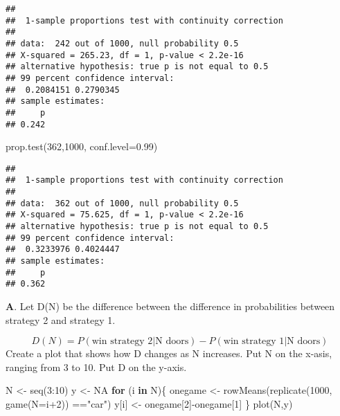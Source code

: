 \documentclass[
]{article}
\newenvironment{Shaded}{\begin{snugshade}}{\end{snugshade}}
\newcommand{\AttributeTok}[1]{\textcolor[rgb]{0.77,0.63,0.00}{#1}}
\newcommand{\ConstantTok}[1]{\textcolor[rgb]{0.00,0.00,0.00}{#1}}
\newcommand{\ControlFlowTok}[1]{\textcolor[rgb]{0.13,0.29,0.53}{\textbf{#1}}}
\newcommand{\DecValTok}[1]{\textcolor[rgb]{0.00,0.00,0.81}{#1}}
\newcommand{\FloatTok}[1]{\textcolor[rgb]{0.00,0.00,0.81}{#1}}
\newcommand{\FunctionTok}[1]{\textcolor[rgb]{0.00,0.00,0.00}{#1}}
\newcommand{\NormalTok}[1]{#1}
\newcommand{\OtherTok}[1]{\textcolor[rgb]{0.56,0.35,0.01}{#1}}
\newcommand{\SpecialCharTok}[1]{\textcolor[rgb]{0.00,0.00,0.00}{#1}}
\newcommand{\StringTok}[1]{\textcolor[rgb]{0.31,0.60,0.02}{#1}}
\begin{document}
\begin{verbatim}
## 
##  1-sample proportions test with continuity correction
## 
## data:  242 out of 1000, null probability 0.5
## X-squared = 265.23, df = 1, p-value < 2.2e-16
## alternative hypothesis: true p is not equal to 0.5
## 99 percent confidence interval:
##  0.2084151 0.2790345
## sample estimates:
##     p 
## 0.242
\end{verbatim}

\begin{Shaded}
\begin{Highlighting}[]
\FunctionTok{prop.test}\NormalTok{(}\DecValTok{362}\NormalTok{,}\DecValTok{1000}\NormalTok{, }\AttributeTok{conf.level=}\FloatTok{0.99}\NormalTok{)}
\end{Highlighting}
\end{Shaded}

\begin{verbatim}
## 
##  1-sample proportions test with continuity correction
## 
## data:  362 out of 1000, null probability 0.5
## X-squared = 75.625, df = 1, p-value < 2.2e-16
## alternative hypothesis: true p is not equal to 0.5
## 99 percent confidence interval:
##  0.3233976 0.4024447
## sample estimates:
##     p 
## 0.362
\end{verbatim}

\textbf{A}. Let D(N) be the difference between the difference in
probabilities between strategy 2 and strategy 1.

\[
D(N) = P(\text{win strategy 2}|\text{N doors}) - P(\text{win strategy 1}|\text{N doors})
\] Create a plot that shows how D changes as N increases. Put N on the
x-asis, ranging from 3 to 10. Put D on the y-axis.

\begin{Shaded}
\begin{Highlighting}[]
\NormalTok{N }\OtherTok{\textless{}{-}} \FunctionTok{seq}\NormalTok{(}\DecValTok{3}\SpecialCharTok{:}\DecValTok{10}\NormalTok{)}
\NormalTok{y }\OtherTok{\textless{}{-}} \ConstantTok{NA}
\ControlFlowTok{for}\NormalTok{ (i }\ControlFlowTok{in}\NormalTok{ N)\{}
\NormalTok{  onegame }\OtherTok{\textless{}{-}} \FunctionTok{rowMeans}\NormalTok{(}\FunctionTok{replicate}\NormalTok{(}\DecValTok{1000}\NormalTok{, }\FunctionTok{game}\NormalTok{(}\AttributeTok{N=}\NormalTok{i}\SpecialCharTok{+}\DecValTok{2}\NormalTok{)) }\SpecialCharTok{==}\StringTok{"car"}\NormalTok{)}
\NormalTok{  y[i] }\OtherTok{\textless{}{-}}\NormalTok{ onegame[}\DecValTok{2}\NormalTok{]}\SpecialCharTok{{-}}\NormalTok{onegame[}\DecValTok{1}\NormalTok{]}
\NormalTok{\}}
\FunctionTok{plot}\NormalTok{(N,y)}
\end{Highlighting}
\end{Shaded}
\end{document}
